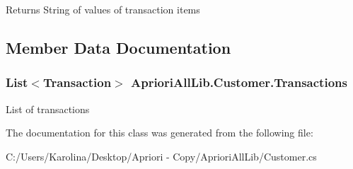 \begin{DoxyReturn}{Returns}
String of values of transaction items
\end{DoxyReturn}


\subsection{Member Data Documentation}
\hypertarget{class_apriori_all_lib_1_1_customer_a5bf3b782d5e9c582e3f395834b7bddad}{
\subsubsection[{Transactions}]{\setlength{\rightskip}{0pt plus 5cm}List$<${\bf Transaction}$>$ Apriori\-All\-Lib.\-Customer.\-Transactions}}\label{class_apriori_all_lib_1_1_customer_a5bf3b782d5e9c582e3f395834b7bddad}


List of transactions 



The documentation for this class was generated from the following file\-:\begin{DoxyCompactItemize}
\item 
C\-:/\-Users/\-Karolina/\-Desktop/\-Apriori -\/ Copy/\-Apriori\-All\-Lib/Customer.\-cs\end{DoxyCompactItemize}
